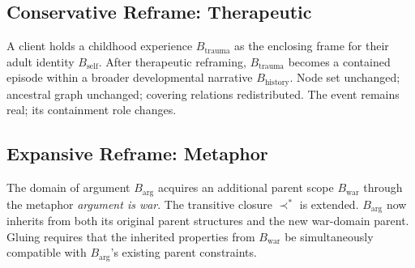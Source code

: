 \documentclass[12pt, a4paper]{article}
\theoremstyle{plain}
\theoremstyle{definition}
\theoremstyle{remark}
\begin{document}
\subsection*{Conservative Reframe: Therapeutic}

A client holds a childhood experience $B_{\text{trauma}}$ as the enclosing
frame for their adult identity $B_{\text{self}}$. After therapeutic
reframing, $B_{\text{trauma}}$ becomes a contained episode within a broader
developmental narrative $B_{\text{history}}$. Node set unchanged; ancestral
graph unchanged; covering relations redistributed. The event remains real;
its containment role changes.

\subsection*{Expansive Reframe: Metaphor}

The domain of argument $B_{\text{arg}}$ acquires an additional parent scope
$B_{\text{war}}$ through the metaphor \emph{argument is war}. The transitive
closure $\prec^*$ is extended. $B_{\text{arg}}$ now inherits from both its
original parent structures and the new war-domain parent. Gluing requires
that the inherited properties from $B_{\text{war}}$ be simultaneously
compatible with $B_{\text{arg}}$'s existing parent constraints.
\end{document}
